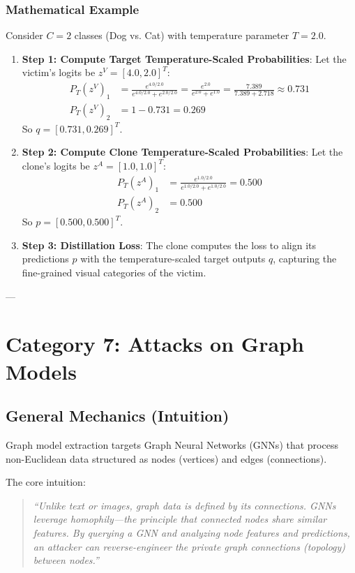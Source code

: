 \documentclass{article}
\begin{document}
\subsubsection{Mathematical Example}
Consider $C=2$ classes (Dog vs. Cat) with temperature parameter $T = 2.0$.
\begin{enumerate}
    \item \textbf{Step 1: Compute Target Temperature-Scaled Probabilities}: Let the victim's logits be $z^V = [4.0, 2.0]^T$:
    \begin{align*}
        P_T(z^V)_1 &= \frac{e^{4.0 / 2.0}}{e^{4.0 / 2.0} + e^{2.0 / 2.0}} = \frac{e^{2.0}}{e^{2.0} + e^{1.0}} = \frac{7.389}{7.389 + 2.718} \approx 0.731 \\
        P_T(z^V)_2 &= 1 - 0.731 = 0.269
    \end{align*}
    So $q = [0.731, 0.269]^T$.
    
    \item \textbf{Step 2: Compute Clone Temperature-Scaled Probabilities}: Let the clone's logits be $z^A = [1.0, 1.0]^T$:
    \begin{align*}
        P_T(z^A)_1 &= \frac{e^{1.0 / 2.0}}{e^{1.0 / 2.0} + e^{1.0 / 2.0}} = 0.500 \\
        P_T(z^A)_2 &= 0.500
    \end{align*}
    So $p = [0.500, 0.500]^T$.
    
    \item \textbf{Step 3: Distillation Loss}: The clone computes the loss to align its predictions $p$ with the temperature-scaled target outputs $q$, capturing the fine-grained visual categories of the victim.
\end{enumerate}

---

\section{Category 7: Attacks on Graph Models}

\subsection{General Mechanics (Intuition)}
Graph model extraction targets Graph Neural Networks (GNNs) that process non-Euclidean data structured as nodes (vertices) and edges (connections). 

The core intuition:
\begin{quote}
    \textit{``Unlike text or images, graph data is defined by its connections. GNNs leverage homophily—the principle that connected nodes share similar features. By querying a GNN and analyzing node features and predictions, an attacker can reverse-engineer the private graph connections (topology) between nodes.''}
\end{quote}
\end{document}
